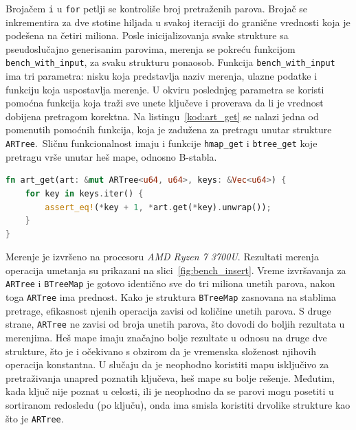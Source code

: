 \documentclass[12pt,oneside]{memoir}
\begin{document}
Brojačem \texttt{i} u \texttt{for} petlji se kontroliše broj pretraženih
parova. Brojač se inkrementira za dve stotine hiljada u svakoj iteraciji do
granične vrednosti koja je podešena na četiri miliona.
Posle inicijalizovanja svake strukture sa pseudoslučajno generisanim parovima,
merenja se pokreću funkcijom \texttt{bench\_with\_input}, za svaku strukturu
ponaosob. Funkcija \texttt{bench\_with\_input} ima tri parametra: nisku koja
predstavlja naziv merenja, ulazne podatke i funkciju koja uspostavlja merenje.
U okviru poslednjeg parametra se koristi pomoćna funkcija koja traži sve
unete ključeve i proverava da li je vrednost dobijena pretragom
korektna. Na listingu~\ref{kod:art_get} se nalazi jedna od pomenutih
pomoćnih funkcija, koja je
zadužena za pretragu unutar strukture \texttt{ARTree}.\ Sličnu funkcionalnost imaju i
funkcije \texttt{hmap\_get} i \texttt{btree\_get} koje pretragu vrše
unutar heš mape, odnosno B-stabla.

\begin{lstlisting}[language=Rust,
                   caption={Funkcija \texttt{art\_get}},
                   label={kod:art_get}]
fn art_get(art: &mut ARTree<u64, u64>, keys: &Vec<u64>) {
    for key in keys.iter() {
        assert_eq!(*key + 1, *art.get(*key).unwrap());
    }
}
\end{lstlisting}

Merenje je izvršeno na procesoru \textit{AMD Ryzen 7 3700U}. Rezultati merenja
operacija umetanja su prikazani na slici~\ref{fig:bench_insert}.
Vreme izvršavanja za \texttt{ARTree} i \texttt{BTreeMap} je gotovo identično
sve do tri miliona unetih parova, nakon toga \texttt{ARTree} ima prednost.
Kako je struktura \texttt{BTreeMap} zasnovana na stablima pretrage,
efikasnost njenih operacija zavisi od količine unetih parova.
S druge strane, \texttt{ARTree} ne zavisi od broja unetih parova, što dovodi
do boljih rezultata u merenjima.
Heš mape imaju značajno bolje rezultate u odnosu na druge dve strukture,
što je i očekivano
s obzirom da je vremenska složenost njihovih operacija konstantna.
U slučaju da je neophodno koristiti mapu isključivo za pretraživanja unapred
poznatih ključeva, heš mape su bolje rešenje. Međutim, kada ključ nije poznat
u celosti,
ili je neophodno da se parovi mogu posetiti u sortiranom redosledu (po ključu),
onda ima smisla koristiti drvolike strukture kao što je
\texttt{ARTree}.
\end{document}
